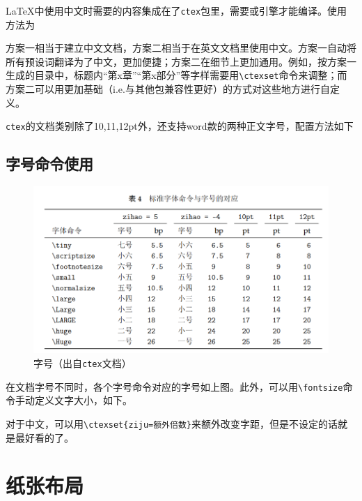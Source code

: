 \documentclass[10pt,openany]{book}
\begin{document}
\begin{sloppypar}
    {\LaTeX}中使用中文时需要的内容集成在了\texttt{ctex}包里，需要{\XeLaTeX}或{\LuaLaTeX}引擎才能编译。使用方法为

    

    方案一相当于建立中文文档，方案二相当于在英文文档里使用中文。方案一自动将所有预设词翻译为了中文，更加便捷；方案二在细节上更加通用。例如，按方案一生成的目录中，标题内“第x章”“第x部分”等字样需要用\texttt{\textbackslash{}ctexset}命令来调整；而方案二可以用更加基础（i.e.与其他包兼容性更好）的方式对这些地方进行自定义。

    \texttt{ctex}的文档类别除了10,11,12pt外，还支持word款的两种正文字号，配置方法如下

    

    \subsection{字号命令使用}

    \begin{figure}[H]
        \centering
        \includegraphics[width=\linewidth]{data/fontsize.png}
        \caption{字号（出自\texttt{ctex}文档）}
    \end{figure}

    在文档字号不同时，各个字号命令对应的字号如上图。此外，可以用\texttt{\textbackslash{}fontsize}命令手动定义文字大小，如下。

    

    对于中文，可以用\texttt{\textbackslash{}ctexset\{ziju=额外倍数\}}来额外改变字距，但是不设定的话就是最好看的了。

    \section{纸张布局}


\end{sloppypar}
\end{document}
